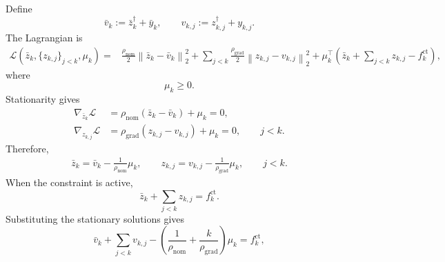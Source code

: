 \documentclass{article}
\begin{document}
Define
\begin{equation}
    \bar v_k := \bar z_k^\dagger + \bar y_k,
    \qquad
    v_{k,j} := z_{k,j}^\dagger + y_{k,j}.
\end{equation}
The Lagrangian is
\begin{equation}
    \begin{aligned}
        \mathcal{L}
        \left(
            \bar z_k,
            \{z_{k,j}\}_{j<k},
            \mu_k
        \right)
        ={}&
        \frac{\rho_{\mathrm{nom}}}{2}
        \left\|
            \bar z_k-\bar v_k
        \right\|_2^2 +
        \sum_{j<k}
        \frac{\rho_{\mathrm{grad}}}{2}
        \left\|
            z_{k,j}-v_{k,j}
        \right\|_2^2
        +
        \mu_k^\top
        \left(
            \bar z_k
            +
            \sum_{j<k}z_{k,j}
            -
            f_k^{\mathrm{ct}}
        \right),
    \end{aligned}
\end{equation}
where
\begin{equation}
    \mu_k \geq 0.
\end{equation}
Stationarity gives
\begin{equation}
    \begin{aligned}
        \nabla_{\bar z_k}\mathcal{L}
        &=
        \rho_{\mathrm{nom}}
        \left(
            \bar z_k-\bar v_k
        \right)
        +
        \mu_k
        =
        0,
        \\
        \nabla_{z_{k,j}}\mathcal{L}
        &=
        \rho_{\mathrm{grad}}
        \left(
            z_{k,j}-v_{k,j}
        \right)
        +
        \mu_k
        =
        0,
        \qquad j<k.
    \end{aligned}
\end{equation}
Therefore,
\begin{equation}
    \begin{aligned}
        \bar z_k
        =
        \bar v_k
        -
        \frac{1}{\rho_{\mathrm{nom}}}\mu_k, \qquad
        z_{k,j}
        =
        v_{k,j}
        -
        \frac{1}{\rho_{\mathrm{grad}}}\mu_k,
        \qquad j<k.
    \end{aligned}
\end{equation}
When the constraint is active,
\begin{equation}
    \bar z_k
    +
    \sum_{j<k}z_{k,j}
    =
    f_k^{\mathrm{ct}}.
\end{equation}
Substituting the stationary solutions gives
\begin{equation}
    \bar v_k
    +
    \sum_{j<k}v_{k,j}
    -
    \left(
        \frac{1}{\rho_{\mathrm{nom}}}
        +
        \frac{k}{\rho_{\mathrm{grad}}}
    \right)\mu_k
    =
    f_k^{\mathrm{ct}},
\end{equation}
\end{document}
